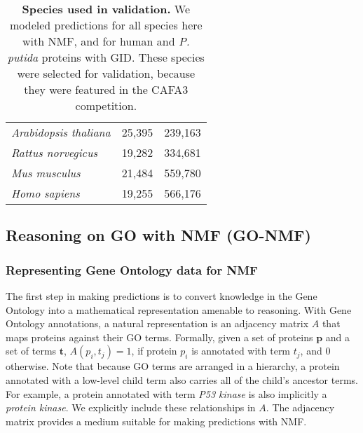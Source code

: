 \documentclass[12pt,a4paper]{report}
\begin{document}
\begin{table*}
\begin{minipage}[c][\textheight]{\textwidth}
\begin{tabular}{lll}
\textit{Arabidopsis thaliana}                                                                           & 25,395   & 239,163     \\
\textit{Rattus norvegicus}                                                                              & 19,282   & 334,681     \\
\textit{Mus musculus}                                                                                   & 21,484   & 559,780     \\
\textit{Homo sapiens}                                                                                   & 19,255   & 566,176  \\  \hline
\end{tabular}
 \caption[Species used in validation.]{\textbf{Species used in validation.} We modeled predictions for all species here with NMF, and for human and \textit{P. putida} proteins with GID. These species were selected for validation, because they were featured in the CAFA3 competition.}
  \label{table:table_go}
    \end{minipage}
\end{table*}


\subsection{Reasoning on GO with NMF (GO-NMF)}

\subsubsection{Representing Gene Ontology data for NMF}
The first step in making predictions is to convert knowledge in the Gene Ontology into a mathematical representation amenable to reasoning. With Gene Ontology annotations, a natural representation is an adjacency matrix $A$ that maps proteins against their GO terms. Formally, given a set of proteins $\textbf{p}$ and a set of terms $\textbf{t}$, $A(p_{i}, t_{j}) = 1$, if protein $p_{i}$ is annotated with term $t_{j}$, and 0 otherwise. Note that because GO terms are arranged in a hierarchy, a protein annotated with a low-level child term also carries all of the child's ancestor terms. For example, a protein annotated with term \textit{P53 kinase}  is also implicitly a \textit{protein kinase}. We explicitly include these relationships in $A$. The adjacency matrix provides a medium suitable for making predictions with NMF.
\end{document}
